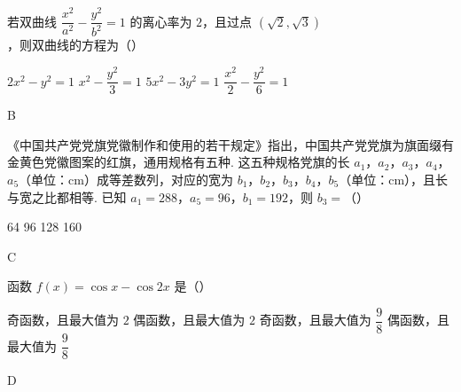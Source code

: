 \begin{problem}
若双曲线 \(\dfrac{x^2}{a^2}-\dfrac{y^2}{b^2}=1\) 的离心率为 \(2\)，且过点 \((\sqrt2,\sqrt3)\)，则双曲线的方程为（\quad）

\choices
    {\(2x^2-y^2=1\)}
    {\(x^2-\dfrac{y^2}{3}=1\)}
    {\(5x^2-3y^2=1\)}
    {\(\dfrac{x^2}{2}-\dfrac{y^2}{6}=1\)}
\end{problem}

\begin{answer}
B
\end{answer}

\begin{problem}
《中国共产党党旗党徽制作和使用的若干规定》指出，中国共产党党旗为旗面缀有金黄色党徽图案的红旗，通用规格有五种. 这五种规格党旗的长 \(a_1\)，\(a_2\)，\(a_3\)，\(a_4\)，\(a_5\)（单位：\(\mathrm{cm}\)）成等差数列，对应的宽为 \(b_1\)，\(b_2\)，\(b_3\)，\(b_4\)，\(b_5\)（单位：\(\mathrm{cm}\)），且长与宽之比都相等. 已知 \(a_1=288\)，\(a_5=96\)，\(b_1=192\)，则 \(b_3=\)（\quad）

\choices
    {64}
    {96}
    {128}
    {160}
\end{problem}

\begin{answer}
C
\end{answer}

\begin{problem}
函数 \(f(x)=\cos x-\cos2x\) 是（\quad）

\choices
    {奇函数，且最大值为 \(2\)}
    {偶函数，且最大值为 \(2\)}
    {奇函数，且最大值为 \(\dfrac{9}{8}\)}
    {偶函数，且最大值为 \(\dfrac{9}{8}\)}
\end{problem}

\begin{answer}
D
\end{answer}

